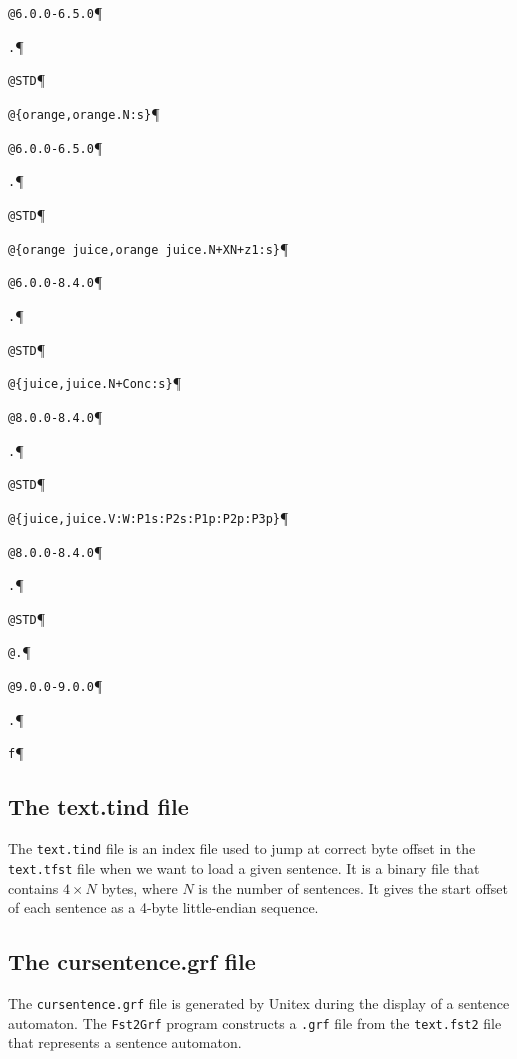 \noindent\verb$@6.0.0-6.5.0$\P

\noindent\verb$.$\P

\noindent\verb$@STD$\P

\noindent\verb$@{orange,orange.N:s}$\P

\noindent\verb$@6.0.0-6.5.0$\P

\noindent\verb$.$\P

\noindent\verb$@STD$\P

\noindent\verb$@{orange juice,orange juice.N+XN+z1:s}$\P

\noindent\verb$@6.0.0-8.4.0$\P

\noindent\verb$.$\P

\noindent\verb$@STD$\P

\noindent\verb$@{juice,juice.N+Conc:s}$\P

\noindent\verb$@8.0.0-8.4.0$\P

\noindent\verb$.$\P

\noindent\verb$@STD$\P

\noindent\verb$@{juice,juice.V:W:P1s:P2s:P1p:P2p:P3p}$\P

\noindent\verb$@8.0.0-8.4.0$\P

\noindent\verb$.$\P

\noindent\verb$@STD$\P

\noindent\verb$@.$\P

\noindent\verb$@9.0.0-9.0.0$\P

\noindent\verb$.$\P

\noindent\verb$f$\P






\subsection{The text.tind file}
The \verb+text.tind+ file is an index file used to jump at correct byte offset
in the \verb+text.tfst+ file when we want to load a given sentence. It is a
binary file that contains $4 \times N$ bytes, where $N$ is the number of
sentences. It gives the start offset of each sentence as a 4-byte
little-endian sequence.


\subsection{The cursentence.grf file}
\label{section-cursentence_grf}
The \verb+cursentence.grf+ file is generated by Unitex during the display of a
sentence automaton. The \verb+Fst2Grf+ program constructs a \verb+.grf+ file from
the \verb+text.fst2+ file that represents a sentence automaton.

